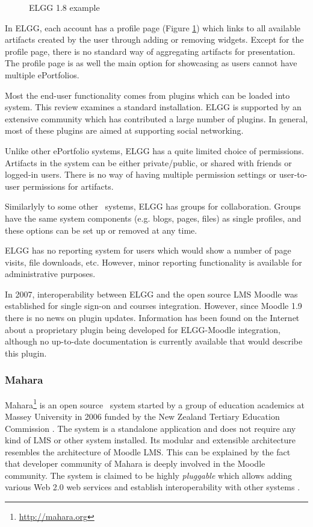 \begin{figure}[htb]
\centering
\setlength\fboxsep{0pt}
\setlength\fboxrule{0.5pt}
\caption{ELGG 1.8 example}
\label{fig:elgg}
\end{figure}

In ELGG, each account has a profile page (Figure \ref{fig:elgg}) which links to
all available artifacts created by the user through adding or removing widgets.
Except for the profile page, there is no standard way of aggregating artifacts
for presentation. The profile page is as well the main option for showcasing as
users cannot have multiple ePortfolios.

Most the end-user functionality comes from plugins which can be loaded into
system. This review examines a standard installation. ELGG is supported by an
extensive community which has contributed a large number of plugins. In
general, most of these plugins are aimed at supporting social networking.

Unlike other ePortfolio systems, ELGG has a quite limited choice of permissions.
Artifacts in the system can be either private/public, or shared with friends
or logged-in users. There is no way of having multiple permission settings or
user-to-user permissions for artifacts.

Similarlyly to some other \ep~systems, ELGG has groups for collaboration. Groups
have the same system components (e.g. blogs, pages, files) as single profiles,
and these options can be set up or removed at any time.

ELGG has no reporting system for users which would show a number of page
visits, file downloads, etc. However, minor reporting functionality is available
for administrative purposes.

In 2007, interoperability between ELGG and the open source LMS Moodle was
established for single sign-on and courses integration. However, since Moodle
1.9 there is no news on plugin updates. Information has been found on the
Internet about a proprietary plugin being developed for ELGG-Moodle integration,
although no up-to-date documentation is currently available that would describe
this plugin.
 
\subsubsection{Mahara}
Mahara\footnote{\url{http://mahara.org}} is an open source \ep~system started by
a group of education academics at Massey University in 2006 funded by the New
Zealand Tertiary Education Commission \citep{Brown2007}. The system is a
standalone application and does not require any kind of LMS or other system
installed. Its modular and extensible architecture resembles the architecture of
Moodle LMS. This can be explained by the fact that developer community of Mahara
is deeply involved in the Moodle community. The system is claimed to be highly
\textit{pluggable} which allows adding various Web 2.0 web services and
establish interoperability with other systems \citep{MaharaGovernanceGroup2011}.

